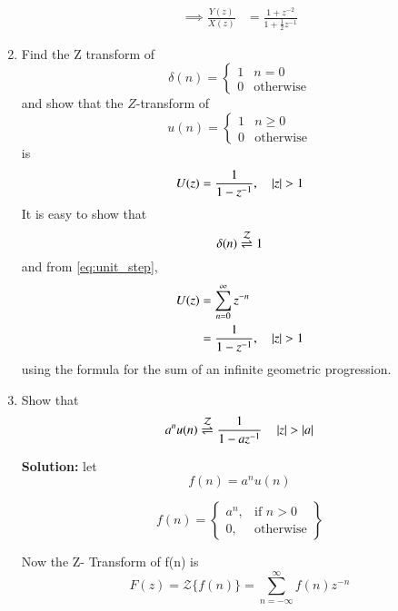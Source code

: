 \documentclass[journal,12pt,twocolumn]{IEEEtran}
\renewcommand\thesection{\arabic{section}}
\begin{document}
\begin{enumerate}[label=\thesection.\arabic*]
\begin{align}
	\implies \frac{Y(z)}{X(z)} &= \frac{1 + z^{-2}}{1 + \frac{1}{2}z^{-1}}
	\label{eq:freq_resp}
\end{align}
%
\item Find the Z transform of 
\begin{equation}
	\delta(n)
	=
	\begin{cases}
		1 & n = 0
		\\
		0 & \text{otherwise}
	\end{cases}
\end{equation}
and show that the $Z$-transform of
\begin{equation}
	\label{eq:unit_step}
	u(n)
	=
	\begin{cases}
		1 & n \ge 0
		\\
		0 & \text{otherwise}
	\end{cases}
\end{equation}
is
\begin{equation}
	U(z) = \frac{1}{1-z^{-1}}, \quad \left\vert z\right\vert > 1
\end{equation}
\solution It is easy to show that
\begin{equation}
	\delta(n) \overset{\mathcal{Z}}{ \rightleftharpoons} 1
\end{equation}
and from \eqref{eq:unit_step},
\begin{align}
	U(z) &= \sum _{n= 0}^{\infty}z^{-n}
	\\
	&=\frac{1}{1-z^{-1}}, \quad \left\vert z\right\vert > 1
\end{align}
using the formula for the sum of an infinite geometric progression.
%
\item Show that 
\begin{equation}
	\label{eq:anun}
	a^nu(n) \overset{\mathcal{Z}}{ \rightleftharpoons} \frac{1}{1-az^{-1}} \quad \left\vert z\right\vert > \left\vert a\right\vert
\end{equation}
%

\textbf{Solution: }
let
\begin{equation}
	f(n) = a^n u(n)
\end{equation}

\begin{equation}
	f(n) = 
	\left\{
	\begin{array}{lr}
		a^n, & \text{if } n>0\\
		0  , & \text{otherwise}
	\end{array}
	\right\}
\end{equation}

Now the Z- Transform of f(n) is
\begin{equation}
	F(z) = {\mathcal {Z}}\{f(n)\} = \sum_{n=-\infty}^{\infty} f(n)z^{-n}
\end{equation}


\end{enumerate}
\end{document}
